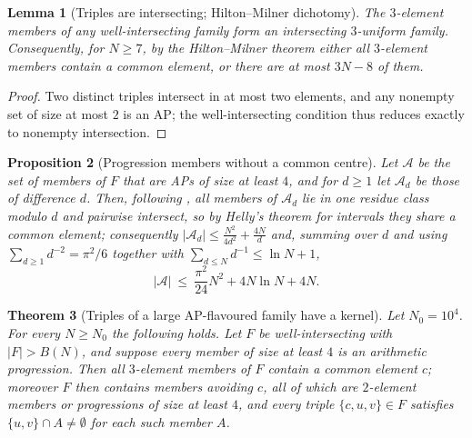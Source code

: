 \documentclass[11pt]{article}
\newtheorem{theorem}{Theorem}[section]
\newtheorem{lemma}[theorem]{Lemma}
\newtheorem{proposition}[theorem]{Proposition}
\theoremstyle{definition}
\begin{document}
\begin{lemma}[Triples are intersecting; Hilton--Milner dichotomy]\label{lem:HM}
The $3$-element members of any well-intersecting family form an intersecting $3$-uniform family. Consequently, for $N\ge7$, by the Hilton--Milner theorem \cite{HM67} either all $3$-element members contain a common element, or there are at most $3N-8$ of them.
\end{lemma}

\begin{proof}
Two distinct triples intersect in at most two elements, and any nonempty set of size at most $2$ is an AP; the well-intersecting condition thus reduces exactly to nonempty intersection.
\end{proof}

\begin{proposition}[Progression members without a common centre]\label{prop:helly}
Let $\mathcal A$ be the set of members of $F$ that are APs of size at least $4$, and for $d\ge1$ let $\mathcal A_d$ be those of difference $d$. Then, following \cite[Corollary~2.4]{Sz99}, all members of $\mathcal A_d$ lie in one residue class modulo $d$ and pairwise intersect, so by Helly's theorem for intervals they share a common element; consequently $|\mathcal A_d|\le \frac{N^2}{4d^2}+\frac{4N}{d}$ and, summing over $d$ and using $\sum_{d\ge1}d^{-2}=\pi^2/6$ together with $\sum_{d\le N}d^{-1}\le\ln N+1$,
\[ |\mathcal A|\ \le\ \frac{\pi^2}{24}N^2+4N\ln N+4N. \]
\end{proposition}

\begin{theorem}[Triples of a large AP-flavoured family have a kernel]\label{thm:tristar}
Let $N_0=10^4$. For every $N\ge N_0$ the following holds. Let $F$ be well-intersecting with $|F|>B(N)$, and suppose every member of size at least $4$ is an arithmetic progression. Then all $3$-element members of $F$ contain a common element $c$; moreover $F$ then contains members avoiding $c$, all of which are $2$-element members or progressions of size at least $4$, and every triple $\{c,u,v\}\in F$ satisfies $\{u,v\}\cap A\neq\emptyset$ for each such member $A$.
\end{theorem}
\end{document}
